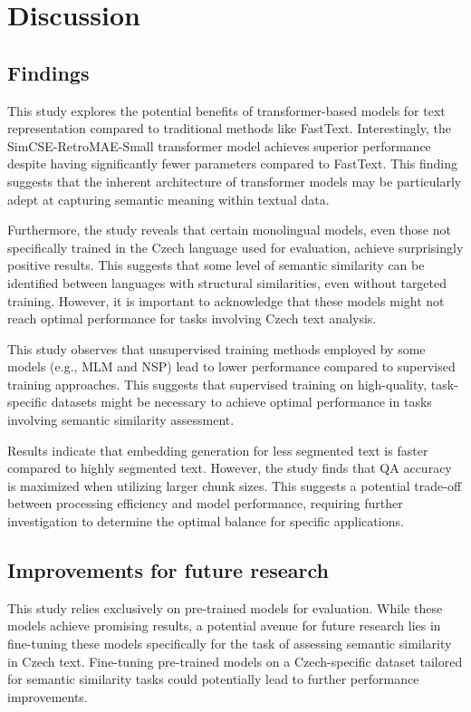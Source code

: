 
\chapter{Discussion\label{chap:discussion}}

\section{Findings}
This study explores the potential benefits of transformer-based models for text representation compared to traditional methods like FastText.
Interestingly, the SimCSE-RetroMAE-Small transformer model achieves superior performance despite having significantly fewer parameters compared to FastText.
This finding suggests that the inherent architecture of transformer models may be particularly adept at capturing semantic meaning within textual data.

Furthermore, the study reveals that certain monolingual models, even those not specifically trained in the Czech language used for evaluation, achieve surprisingly positive results.
This suggests that some level of semantic similarity can be identified between languages with structural similarities, even without targeted training.
However, it is important to acknowledge that these models might not reach optimal performance for tasks involving Czech text analysis.

This study observes that unsupervised training methods employed by some models (e.g., \ac{MLM} and \ac{NSP}) lead to lower performance compared to supervised training approaches.
This suggests that supervised training on high-quality, task-specific datasets might be necessary to achieve optimal performance in tasks involving semantic similarity assessment.

Results indicate that embedding generation for less segmented text is faster compared to highly segmented text.
However, the study finds that \ac{QA} accuracy is maximized when utilizing larger chunk sizes.
This suggests a potential trade-off between processing efficiency and model performance, requiring further investigation to determine the optimal balance for specific applications.

\section{Improvements for future research}
This study relies exclusively on pre-trained models for evaluation.
While these models achieve promising results, a potential avenue for future research lies in fine-tuning these models specifically for the task of assessing semantic similarity in Czech text.
Fine-tuning pre-trained models on a Czech-specific dataset tailored for semantic similarity tasks could potentially lead to further performance improvements.

